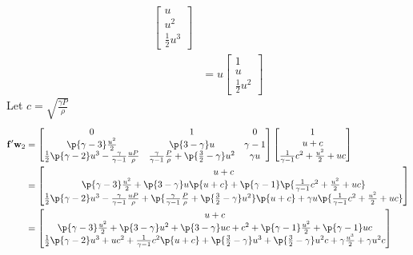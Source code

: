 \documentclass[11pt, oneside]{article}
\begin{document}
\begin{enumerate}
\begin{align*}
      \begin{bmatrix}
        u \\
        u^2 \\
        \frac{1}{2}u^3
      \end{bmatrix} \\
      &= u
      \begin{bmatrix}
        1 \\
        u \\
        \frac{1}{2}u^2
      \end{bmatrix}
    \end{align*}
    Let $c = \sqrt{\frac{\gamma P}{\rho}}$
    \begin{align*}
      \v{f}' \v{w}_2 &= 
      \begin{bmatrix}
        0 & 1 & 0 \\
        \p{\gamma - 3} \frac{u^2}{2} & \p{3 - \gamma}u & \gamma - 1 \\
        \frac{1}{2}\p{\gamma - 2} u^3 - \frac{\gamma}{\gamma - 1}\frac{uP}{\rho} & \frac{\gamma}{\gamma - 1}\frac{P}{\rho} + \p{\frac{3}{2} - \gamma}u^2  & \gamma u
      \end{bmatrix}
      \begin{bmatrix}
        1 \\
        u + c \\
        \frac{1}{\gamma - 1}c^2 + \frac{u^2}{2} + uc \\
      \end{bmatrix} \\
      &=
      \begin{bmatrix}
        u + c \\
        \p{\gamma - 3} \frac{u^2}{2} + \p{3 - \gamma}u\p{u + c} + \p{\gamma - 1}\p{\frac{1}{\gamma - 1}c^2 + \frac{u^2}{2} + uc} \\
        \frac{1}{2}\p{\gamma - 2} u^3 - \frac{\gamma}{\gamma - 1}\frac{uP}{\rho} + \p{\frac{\gamma}{\gamma - 1}\frac{P}{\rho} + \p{\frac{3}{2} - \gamma}u^2}\p{u + c} + \gamma u \p{\frac{1}{\gamma - 1}c^2 + \frac{u^2}{2} + uc}
      \end{bmatrix} \\
      &=
      \begin{bmatrix}
        u + c \\
        \p{\gamma - 3} \frac{u^2}{2} + \p{3 - \gamma}u^2 + \p{3 - \gamma}uc + c^2 + \p{\gamma - 1}\frac{u^2}{2} + \p{\gamma - 1}uc \\
        \frac{1}{2}\p{\gamma - 2} u^3 + uc^2 + \frac{1}{\gamma - 1}c^2\p{u+c} + \p{\frac{3}{2} - \gamma}u^3 + \p{\frac{3}{2} - \gamma}u^2c + \gamma\frac{u^3}{2} + \gamma u^2c

\end{bmatrix}
\end{align*}
\end{enumerate}
\end{document}
